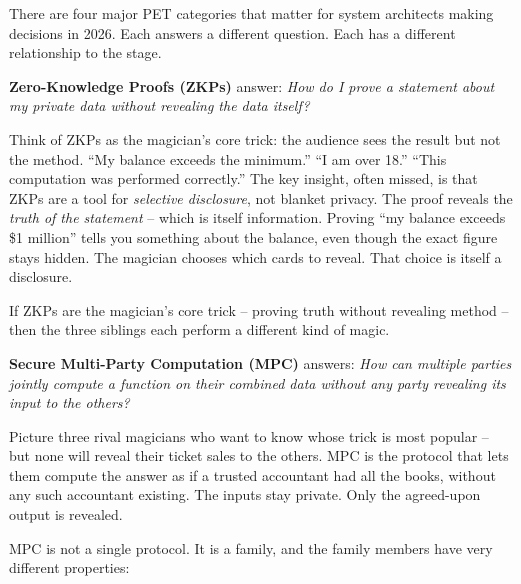 \documentclass[
  11pt,
  openany]{report}
\renewcommand{\textbf}[1]{{\bfseries\color{MidnightBold}#1}}
\begin{document}
There are four major PET categories that matter for system architects making
decisions in 2026. Each answers a different question. Each has a different
relationship to the stage.

\textbf{Zero-Knowledge Proofs (ZKPs)} answer: \emph{How do I prove a statement
about my private data without revealing the data itself?}

Think of ZKPs as the magician's core trick: the audience sees the result but not
the method. ``My balance exceeds the minimum.'' ``I am over 18.'' ``This
computation was performed correctly.'' The key insight, often missed, is that
ZKPs are a tool for \emph{selective disclosure}, not blanket privacy. The proof
reveals the \emph{truth of the statement} -- which is itself information.
Proving ``my balance exceeds \$1 million'' tells you something about the
balance, even though the exact figure stays hidden. The magician chooses which
cards to reveal. That choice is itself a disclosure.

If ZKPs are the magician's core trick -- proving truth without revealing method
-- then the three siblings each perform a different kind of magic.

\textbf{Secure Multi-Party Computation (MPC)} answers: \emph{How can multiple
parties jointly compute a function on their combined data without any party
revealing its input to the others?}

Picture three rival magicians who want to know whose trick is most popular --
but none will reveal their ticket sales to the others. MPC is the protocol that
lets them compute the answer as if a trusted accountant had all the books,
without any such accountant existing. The inputs stay private. Only the
agreed-upon output is revealed.

MPC is not a single protocol. It is a family, and the family members have very
different properties:
\end{document}
